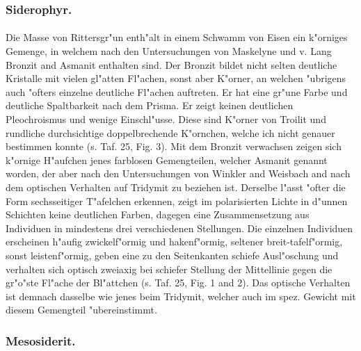 \documentclass[a4paper, 11pt, oneside, polutonikogreek, german]{article}
\begin{document}
\subsubsection{Siderophyr.}
\paragraph{}
Die Masse von Rittersgr"un enth"alt in einem Schwamm von Eisen ein k"orniges Gemenge, in welchem nach den Untersuchungen von Maskelyne und v. Lang Bronzit and Asmanit enthalten sind. Der Bronzit bildet nicht selten deutliche Kristalle mit vielen gl"atten Fl"achen, sonst aber K"orner, an welchen "ubrigens auch "ofters einzelne deutliche Fl"achen auftreten. Er hat eine gr"une Farbe und deutliche Spaltbarkeit nach dem Prisma. Er zeigt keinen deutlichen Pleochroismus und wenige Einschl"usse. Diese sind K"orner von Troilit und rundliche durchsichtige doppelbrechende K"ornchen, welche ich nicht genauer bestimmen konnte (s. Taf. 25, Fig. 3). Mit dem Bronzit verwachsen zeigen sich k"ornige H"aufchen jenes farblosen Gemengteilen, welcher Asmanit genannt worden, der aber nach den Untersuchungen von Winkler and Weisbach and nach dem optischen Verhalten auf Tridymit zu beziehen ist. Derselbe l"asst "ofter die Form sechsseitiger T"afelchen erkennen, zeigt im polarisierten Lichte in d"unnen Schichten keine deutlichen Farben, dagegen eine Zusammensetzung aus Individuen in mindestens drei verschiedenen Stellungen. Die einzelnen Individuen erscheinen h"aufig zwickelf"ormig und hakenf"ormig, seltener breit-tafelf"ormig, sonst leistenf"ormig, geben eine zu den Seitenkanten schiefe Ausl"oschung und verhalten sich optisch zweiaxig bei schiefer Stellung der Mittellinie gegen die gr"o"ste Fl"ache der Bl"attchen (s. Taf. 25, Fig. 1 and 2). Das optische Verhalten ist demnach dasselbe wie jenes beim Tridymit, welcher auch im spez. Gewicht mit diesem Gemengteil "ubereinstimmt.

\subsubsection{Mesosiderit.}
\end{document}
